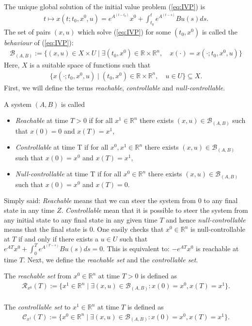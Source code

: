 \noindent The unique global solution of the initial value problem (\ref{eq:IVP}) is
\begin{align*}
	t \mapsto x(t;t_0,x^0,u) = e^{A^{(t-t_0)}}x^0 + \int_{t_0}^t e^{A^{(t-s)}}Bu(s)ds.
\end{align*}
The set of pairs $(x,u)$ which solve (\ref{eq:IVP}) for some $(t_0,x^0)$ is called the \emph{behaviour} of (\ref{eq:IVP}):
\begin{align*}
	\mathcal{B}_{(A,B)} := \{(x,u) \in X\times U\mid \exists (t_0,x^0) \in \mathbb{R}\times\mathbb{R}^n,\quad x(\cdot) = x(\cdot;t_0,x^0,u )    \}
\end{align*}
Here, $X$ is a suitable space of functions such that
\begin{align*}
	\{x(\cdot;t_0,x^0,u ) \mid (t_0,x^0) \in \mathbb{R}\times\mathbb{R}^n, \quad u \in U  \} \subseteq X.
\end{align*}
First, we will define the terms  \emph{reachable}, \emph{controllable} and \emph{null-controllable}.
\begin{mydef}
	A system $(A,B)$ is called
	\begin{itemize}
		\item \emph{Reachable} at time $T > 0$ if for all $x^1 \in \mathbb{R}^n$ there exists $(x,u)\in\mathcal{B}_{(A,B)}$ such that $x(0) = 0$ and $x(T) = x^1$,
		\item \emph{Controllable} at time T if for all $x^0,x^1 \in \mathbb{R}^n$ there exists $(x,u)\in\mathcal{B}_{(A,B)}$ such that $x(0) = x^0$ and $x(T) = x^1$,
		\item \emph{Null-controllable} at time T if for all $x^0 \in \mathbb{R}^n$ there exists $(x,u)\in\mathcal{B}_{(A,B)}$ such that $x(0) = x^0$ and $x(T) = 0$.
	\end{itemize}
\end{mydef}
\noindent Simply said: \emph{Reachable} means that we can steer the system from 0 to any final state in any time $Z$. \emph{Controllable} mean that it is possible to steer the system from any initial state to any final state in any given time $T$ and hence \emph{null-controllable} means that the final state is 0. One easily checks that $x^0 \in\mathbb{R}^n$ is null-controllable at $T$ if and only if there exists a $u\in U$ such that $e^{AT}x^0 + \int_{0}^T e^{A^(T-s)}Bu(s)ds = 0$. This is equivalent to: $-e^{AT}x^0$ is reachable at time $T$.
Next, we define the \emph{reachable set} and the \emph{controllable set}.
\begin{mydef}
	The \emph{reachable set} from $x^0 \in \mathbb{R}^n$ at time $T>0$ is defined as
	\begin{align*}
		\mathcal{R}_{x^0}(T) := \{x^1 \in \mathbb{R}^n \mid \exists (x,u) \in \mathcal{B}_{(A,B)}: x(0) = x^0, x(T) = x^1   \}.
	\end{align*}\\The \emph{controllable set} to $x^1\in\mathbb{R}^n$ at time $T$ is defined as
	\begin{align*}
		\mathcal{C}_{x^1}(T) := \{x^0 \in \mathbb{R}^n \mid \exists (x,u) \in \mathcal{B}_{(A,B)}: x(0) = x^0, x(T) = x^1   \}.
	\end{align*}
\end{mydef}

